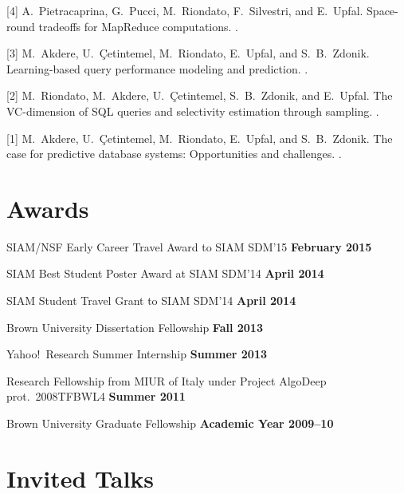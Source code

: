 \documentclass[margin,line]{resume}
\begin{document}
[4] A.~Pietracaprina, G.~Pucci, M.~Riondato, F.~Silvestri, and E.~Upfal.
\newblock Space-round tradeoffs for {MapReduce} computations.
.

[3] M.~Akdere, U.~\c{C}etintemel, M.~Riondato, E.~Upfal, and S.~B.~Zdonik.
\newblock Learning-based query performance modeling and prediction.
.

[2] M.~Riondato, M.~Akdere, U.~\c{C}etintemel, S.~B.~Zdonik, and E.~Upfal.
\newblock The {VC}-dimension of {SQL} queries and selectivity estimation
  through sampling.
.

[1] M.~Akdere, U.~\c{C}etintemel, M.~Riondato, E.~Upfal, and S.~B.~Zdonik.
\newblock The case for predictive database systems: Opportunities and
  challenges.
.


\section{\sc Awards}

SIAM/NSF Early Career Travel Award to SIAM SDM'15 \hfill {\bf February 2015}

SIAM Best Student Poster Award at SIAM SDM'14 \hfill {\bf April 2014}

SIAM Student Travel Grant to SIAM SDM'14 \hfill {\bf April 2014}

Brown University Dissertation Fellowship \hfill {\bf Fall 2013}

Yahoo!~Research Summer Internship \hfill {\bf Summer 2013}

Research Fellowship from MIUR of Italy under Project AlgoDeep prot.~2008TFBWL4
\hfill {\bf Summer 2011}

Brown University Graduate Fellowship \hfill {\bf Academic Year 2009--10}

\section{\sc Invited Talks}
\end{document}
